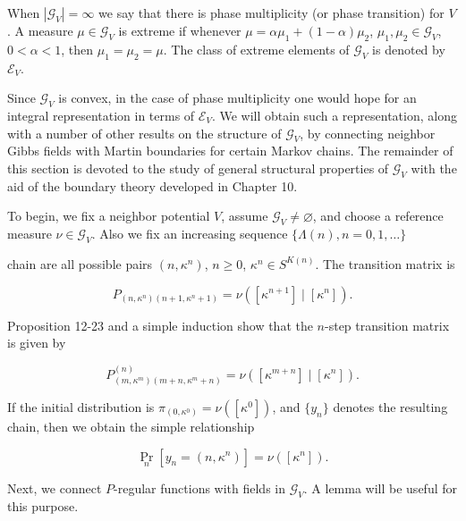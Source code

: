 When $|\mathcal{G}_V| = \infty$ we say that there is phase multiplicity (or phase transition) for $V$. A measure $\mu \in \mathcal{G}_V$ is extreme if whenever $\mu = \alpha \mu_1 + (1 - \alpha)\mu_2$, $\mu_1, \mu_2 \in \mathcal{G}_V$, $0 < \alpha < 1$, then $\mu_1 = \mu_2 = \mu$. The class of extreme elements of $\mathcal{G}_V$ is denoted by $\mathcal{E}_V$.

Since $\mathcal{G}_V$ is convex, in the case of phase multiplicity one would hope for an integral representation in terms of $\mathcal{E}_V$. We will obtain such a representation, along with a number of other results on the structure of $\mathcal{G}_V$, by connecting neighbor Gibbs fields with Martin boundaries for certain Markov chains. The remainder of this section is devoted to the study of general structural properties of $\mathcal{G}_V$ with the aid of the boundary theory developed in Chapter 10.

To begin, we fix a neighbor potential $V$, assume $\mathcal{G}_V \neq \varnothing$, and choose a reference measure $\nu \in \mathcal{G}_V$. Also we fix an increasing sequence $\{\Lambda(n), n = 0, 1, \ldots\}$

chain are all possible pairs $(n, \kappa^n)$, $n \geq 0$, $\kappa^n \in S^{K(n)}$. The transition matrix is

$$P_{(n, \kappa^n)(n+1, \kappa^n+1)} = \nu([\kappa^{n+1}] \mid [\kappa^n]).$$

Proposition 12-23 and a simple induction show that the $n$-step transition matrix is given by

$$P^{(n)}_{(m, \kappa^m)(m+n, \kappa^m+n)} = \nu([\kappa^{m+n}] \mid [\kappa^n]).$$

If the initial distribution is $\pi_{(0, \kappa^0)} = \nu([\kappa^0])$, and $\{y_n\}$ denotes the resulting chain, then we obtain the simple relationship

$$\Pr_n[y_n = (n, \kappa^n)] = \nu([\kappa^n]).$$

Next, we connect $P$-regular functions with fields in $\mathcal{G}_V$. A lemma will be useful for this purpose.
